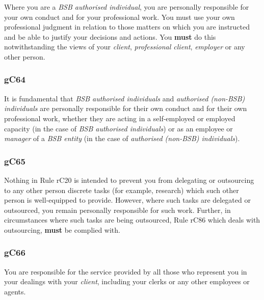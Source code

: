 


Where you are a \emph{BSB authorised individual}, you are personally
responsible for your own conduct and for your professional work. You
must use your own professional judgment in relation to those matters on
which you are instructed and be able to justify your decisions and
actions. You \textcolor{myred}{\textbf{must}} do this notwithstanding the views of your
\emph{client}, \emph{professional client}, \emph{employer} or any other
person.




\subsubsection{\color{darkgrey}gC64}

It is fundamental that \emph{BSB authorised individuals} and
\emph{authorised (non-BSB) individuals} are personally responsible for
their own conduct and for their own professional work, whether they are
acting in a self-employed or employed capacity (in the case of \emph{BSB
authorised individuals}) or as an employee or \emph{manager} of a
\emph{BSB entity} (in the case of \emph{authorised (non-BSB)
individuals}).

\subsubsection{\color{darkgrey}gC65}

Nothing in Rule rC20 is intended to prevent you from delegating or
outsourcing to any other person discrete tasks (for example, research)
which such other person is well-equipped to provide. However, where such
tasks are delegated or outsourced, you remain personally responsible for
such work. Further, in circumstances where such tasks are being
outsourced, Rule rC86 which deals with outsourcing, \textcolor{myred}{\textbf{must}} be complied
with.

\subsubsection{\color{darkgrey}gC66}

You are responsible for the service provided by all those who represent
you in your dealings with your \emph{client}, including your clerks or
any other employees or agents.

